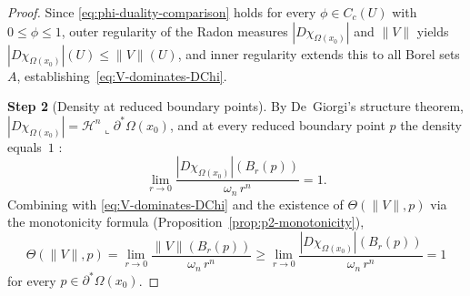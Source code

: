 \begin{proof}
Since \eqref{eq:phi-duality-comparison} holds for every $\phi \in C_c(U)$ with $0\leq\phi\leq 1$, outer regularity of the Radon measures $|D\chi_{\Omega(x_0)}|$ and $\|V\|$ yields $|D\chi_{\Omega(x_0)}|(U) \leq \|V\|(U)$, and inner regularity extends this to all Borel sets $A$, establishing~\eqref{eq:V-dominates-DChi}.

\medskip\noindent\textbf{Step 2} (Density at reduced boundary points).
By De~Giorgi's structure theorem, $|D\chi_{\Omega(x_0)}| = \mathcal{H}^n \llcorner \partial^*\Omega(x_0)$, and at every reduced boundary point $p$ the density equals~$1$ \cite[Corollary~15.8]{Mag12}:
\[
    \lim_{r\to 0} \frac{|D\chi_{\Omega(x_0)}|(B_r(p))}{\omega_n\, r^n} = 1.
\]
Combining with \eqref{eq:V-dominates-DChi} and the existence of $\Theta(\|V\|,p)$ via the monotonicity formula (Proposition~\ref{prop:p2-monotonicity}),
\[
    \Theta(\|V\|, p)
    = \lim_{r\to 0}\frac{\|V\|(B_r(p))}{\omega_n\, r^n}
    \geq \lim_{r\to 0}\frac{|D\chi_{\Omega(x_0)}|(B_r(p))}{\omega_n\, r^n}
    = 1
\]
for every $p \in \partial^*\Omega(x_0)$.
\end{proof}


